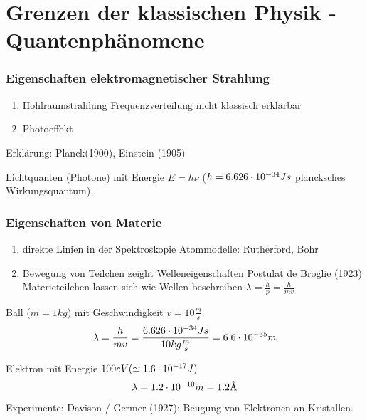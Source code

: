 \section{Grenzen der klassischen Physik - Quantenphänomene} %
\label{sec:Grenzen_der_klassischen_Physik_-_Quantenphänomene}
\subsubsection{Eigenschaften elektromagnetischer Strahlung} %
\label{ssub:Eigenschaften_elektromagnetischer_Strahlung}
\begin{enumerate}
    \item{Hohlraumstrahlung} 
        Frequenzverteilung nicht klassisch erklärbar
    \item{Photoeffekt}  
\end{enumerate}
Erklärung: Planck(1900), Einstein (1905)

Lichtquanten (Photone) mit Energie $E= h \nu$ ($h=6.626 \cdot 10^{-34} Js$
plancksches Wirkungsquantum).
\subsubsection{Eigenschaften von Materie} %
\label{ssub:Eigenschaften_von_Materie}
\begin{enumerate}
    \item{direkte Linien in der Spektroskopie} 
        Atommodelle: Rutherford, Bohr
    \item{Bewegung von Teilchen zeight Welleneigenschaften} 
        Postulat de Broglie (1923)
        Materieteilchen lassen sich wie Wellen beschreiben 
        $\lambda = \frac{h}{p} = \frac{h}{mv}$
\end{enumerate}
\begin{bei}
    \item Ball ($m=1kg$) mit Geschwindigkeit $v = 10 \frac{m}{s}$
     \begin{equation*}
         \lambda = \frac{h}{mv} = \frac{6.626 \cdot 10^{-34}Js}{10 kg \frac{m}{s}} 
         = 6.6 \cdot 10^{-35} m
     \end{equation*}
    \item Elektron mit Energie $100eV (\simeq 1.6 \cdot 10^{-17}J)$
    \begin{equation*}
        \lambda = 1.2 \cdot 10^{-10}m = 1.2\mbox{\normalfont\AA}
    \end{equation*}
\end{bei}
Experimente: Davison / Germer (1927): Beugung von Elektronen an Kristallen.
